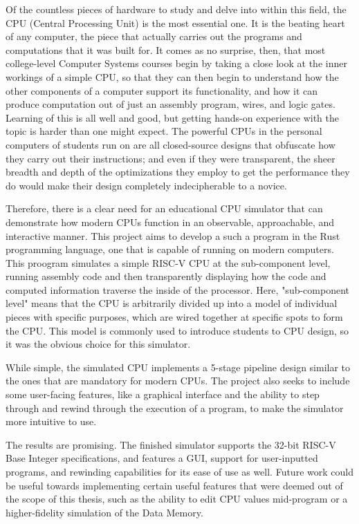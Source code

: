 \documentclass[12pt,twoside]{reedthesis}
\begin{document}
Of the countless pieces of hardware to study and delve into within this field, the CPU (Central Processing Unit) is the most essential one. It is the beating heart of any computer, the piece that actually carries out the programs and computations that it was built for. It comes as no surprise, then, that most college-level Computer Systems courses begin by taking a close look at the inner workings of a simple CPU, so that they can then begin to understand how the other components of a computer support its functionality, and how it can produce computation out of just an assembly program, wires, and logic gates. Learning of this is all well and good, but getting hands-on experience with the topic is harder than one might expect. The powerful CPUs in the personal computers of students run on are all closed-source designs that obfuscate how they carry out their instructions; and even if they were transparent, the sheer breadth and depth of the optimizations they employ to get the performance they do would make their design completely indecipherable to a novice.

Therefore, there is a clear need for an educational CPU simulator that can demonstrate how modern CPUs function in an observable, approachable, and interactive manner. This project aims to develop a such a program in the Rust programming language, one that is capable of running on modern computers. This proogram simulates a simple RISC-V CPU at the sub-component level, running assembly code and then transparently displaying how the code and computed information traverse the inside of the processor.
Here, "sub-component level" means that the CPU is arbitrarily divided up into a model of individual pieces with specific purposes, which are wired together at specific spots to form the CPU. This model is commonly used to introduce students to CPU design, so it was the obvious choice for this simulator.

While simple, the simulated CPU implements a 5-stage pipeline design similar to the ones that are mandatory for modern CPUs. The project also seeks to include some user-facing features, like a graphical interface and the ability to step through and rewind through the execution of a program, to make the simulator more intuitive to use.

The results are promising. The finished simulator supports the 32-bit RISC-V Base Integer specifications, and features a GUI, support for user-inputted programs, and rewinding capabilities for its ease of use as well. Future work could be useful towards implementing certain useful features that were deemed out of the scope of this thesis, such as the ability to edit CPU values mid-program or a higher-fidelity simulation of the Data Memory.
\end{document}

